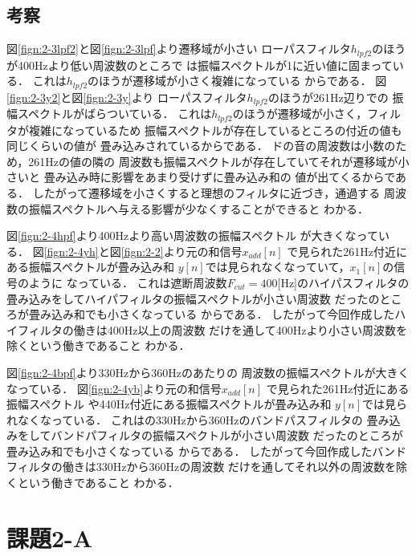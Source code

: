 \documentclass[11pt, a4paper, titlepage]{ltjsarticle}
\begin{document}
\subsection*{考察}
図\ref*{fign:2-3lpf2}と図\ref*{fign:2-3lpf}より遷移域が小さい
ローパスフィルタ$h_{lpf2}$のほうが400Hzより低い周波数のところで
は振幅スペクトルが1に近い値に固まっている．
これは$h_{lpf2}$のほうが遷移域が小さく複雑になっている
からである．
図\ref*{fign:2-3y2}と図\ref*{fign:2-3y}より
ローパスフィルタ$h_{lpf2}$のほうが261Hz辺りでの
振幅スペクトルがばらついている．
これは$h_{lpf2}$のほうが遷移域が小さく，フィルタが複雑になっているため
振幅スペクトルが存在しているところの付近の値も同じくらいの値が
畳み込みされているからである．
ドの音の周波数は小数のため，261Hzの値の隣の
周波数も振幅スペクトルが存在していてそれが遷移域が小さいと
畳み込み時に影響をあまり受けずに畳み込み和の
値が出てくるからである．
したがって遷移域を小さくすると理想のフィルタに近づき，通過する
周波数の振幅スペクトルへ与える影響が少なくすることができると
わかる．

図\ref*{fign:2-4hpf}より400Hzより高い周波数の振幅スペクトル
が大きくなっている．
図\ref*{fign:2-4yh}と図\ref*{fign:2-2}より元の和信号$x_{add}[n]$
で見られた261Hz付近にある振幅スペクトルが畳み込み和
$y[n]$では見られなくなっていて，$x_{1}[n]$の信号のように
なっている．
これは遮断周波数$F_{cut}=400$[Hz]のハイパスフィルタの
畳み込みをしてハイパフィルタの振幅スペクトルが小さい周波数
だったのところが畳み込み和でも小さくなっている
からである．
したがって今回作成したハイフィルタの働きは400Hz以上の周波数
だけを通して400Hzより小さい周波数を除くという働きであること
わかる．

図\ref*{fign:2-4bpf}より330Hzから360Hzのあたりの
周波数の振幅スペクトルが大きくなっている．
図\ref*{fign:2-4yb}より元の和信号$x_{add}[n]$
で見られた261Hz付近にある振幅スペクトル
や440Hz付近にある振幅スペクトルが畳み込み和
$y[n]$では見られなくなっている．
これはの330Hzから360Hzのバンドパスフィルタの
畳み込みをしてバンドパフィルタの振幅スペクトルが小さい周波数
だったのところが畳み込み和でも小さくなっている
からである．
したがって今回作成したバンドフィルタの働きは330Hzから360Hzの周波数
だけを通してそれ以外の周波数を除くという働きであること
わかる．

\newpage
\section*{課題2-A}
\end{document}
